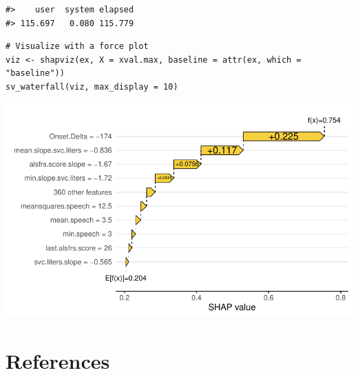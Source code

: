 \begin{verbatim}
#>    user  system elapsed 
#> 115.697   0.080 115.779
\end{verbatim}

\begin{verbatim}
# Visualize with a force plot
viz <- shapviz(ex, X = xval.max, baseline = attr(ex, which = "baseline"))
sv_waterfall(viz, max_display = 10)
\end{verbatim}

\includegraphics[width=1\linewidth]{greenwell_files/figure-latex/als-ngboost-fastshap-1}

\hypertarget{references}{%
\section*{References}\label{references}}

